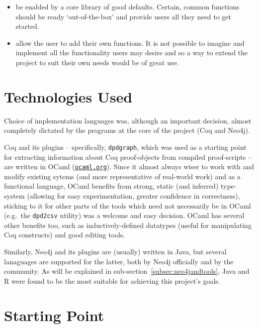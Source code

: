 \begin{itemize}
\begin{itemize}
    \item be enabled by a core library of good defaults. Certain, common
          functions should be ready `out-of-the-box' and provide users
          all they need to get started.

    \item allow the user to add their own functions. It is not possible
          to imagine and implement all the functionality users may desire and
          so a way to extend the project to suit their own needs would be of
          great use.

  \end{itemize}


\end{itemize}

\section{Technologies Used}

Choice of implementation languages was, although an important decision, almost
completely dictated by the programs at the core of the project (Coq and Neo4j).

Coq and its plugins -- specifically, {\tt dpdgraph}, which was used as a
starting point for extracting information about Coq proof-objects from compiled
proof-scripts -- are written in OCaml
(\href{http://ocaml.org}{\texttt{ocaml.org}}).  Since it almost always wiser to
work with and modify existing sytems (and more representative of real-world
work) and as a functional language, OCaml benefits from strong, static (and
inferred) type-system (allowing for easy experimentation, greater confidence in
correctness), sticking to it for other parts of the tools which need not
necessarily be in OCaml (e.g.\ the {\tt dpd2csv} utility) was a welcome and
easy decision. OCaml has several other benefits too, such as
inductively-defined datatypes (useful for manipulating Coq constructs) and good
editing tools.

Similarly, Neo4j and its plugins are (usually) written in Java, but several
lanaguages are supported for the latter, both by Neo4j officially and by the
community. As will be explained in sub-section~\ref{subsec:neo4jandtools}, Java
and R were found to be the most suitable for achieving this project's goals.

\section{Starting Point}

